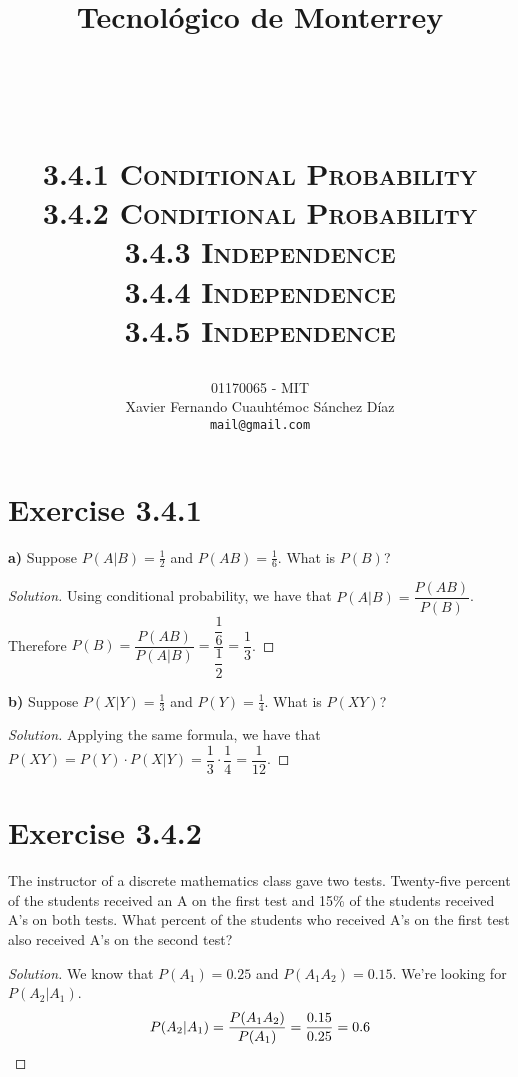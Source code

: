 \documentclass[titlepage, letterpaper, fleqn]{article}
\title{
\vspace{1in}
\textbf{Tecnológico de Monterrey} \\
\vspace{0.5in}
\textmd{\mahclass} \\
\large{\textit{\mahteacher}} \\
\vspace{0.5in}
\textsc{\mahtitle}\\
\textsc{3.4.1 Conditional Probability}\\
\textsc{3.4.2 Conditional Probability}\\
\textsc{3.4.3 Independence}\\
\textsc{3.4.4 Independence}\\
\textsc{3.4.5 Independence}\\
\author{01170065  - MIT \\
Xavier Fernando Cuauhtémoc Sánchez Díaz \\
\texttt{mail@gmail.com}}
\date{\mahdate}
}
\newcommand{\spacepls}{\vspace{5mm}}
\renewcommand\qedsymbol{\(\blacksquare\)}
\newenvironment{solution}
{\renewcommand\qedsymbol{$\square$}\begin{proof}[Solution]}
{\end{proof}}
\begin{document}
\begin{titlepage}
\maketitle
\end{titlepage}

%
%

\section{Exercise 3.4.1}

{\large \textbf{a)} Suppose \(P(A \vert B) = \frac{1}{2}\) and \(P(AB) = \frac{1}{6}\). What is \(P(B)\)?}

\begin{solution}
Using conditional probability, we have that \(P(A \vert B) = \dfrac{P(AB)}{P(B)}\).\\
Therefore \(P(B) = \dfrac{P(AB)}{P(A \vert B)} = \dfrac{\dfrac{1}{6}}{\dfrac{1}{2}} = \dfrac{1}{3}\).
\end{solution}

\spacepls

{\large \textbf{b)} Suppose \(P(X \vert Y) = \frac{1}{3}\) and \(P(Y) = \frac{1}{4}\). What is \(P(XY)\)?}

\begin{solution}
Applying the same formula, we have that \(P(XY) = P(Y) \cdot P(X \vert Y) = \dfrac{1}{3} \cdot \dfrac{1}{4} = \dfrac{1}{12}\).
\end{solution}

\spacepls

\section{Exercise 3.4.2}

{\large The instructor of a discrete mathematics class gave two tests. Twenty-five percent of the students received an A on the first test and 15\% of the students received A's on both tests.
What percent of the students who received A's on the first test also received A's on the second test?}

\begin{solution}
We know that \(P(A_1) = 0.25\) and \(P(A_1 A_2) = 0.15\). We're looking for \(P(A_2 \vert A_1)\).
\[P(A_2 \vert A_1) = \dfrac{P(A_1 A_2)}{P(A_1)} = \dfrac{0.15}{0.25} = 0.6 \qedhere\]
\end{solution}

\spacepls
\end{document}
